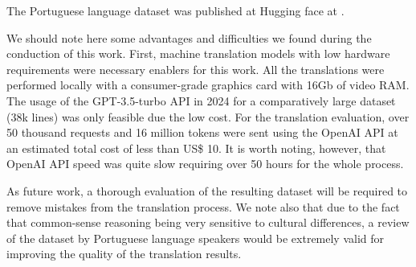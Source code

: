 \documentclass{article}
\begin{document}
The Portuguese language dataset was published at Hugging face at \cite{socialiqa_pt}. 

We should note here some advantages and difficulties we found during the
conduction of this work. First, machine translation models with low hardware
requirements were necessary enablers for this work. All the translations were
performed locally with a consumer-grade graphics card with 16Gb of video RAM.
The usage of the GPT-3.5-turbo API in 2024 for a comparatively large dataset
(38k lines) was only feasible due the low cost. For the translation evaluation,
over 50 thousand requests and 16 million tokens were sent using the OpenAI API
at an estimated total cost of less than US\$ 10. It is worth noting, however,
that OpenAI API speed was quite slow requiring over 50 hours for the whole
process.

As future work, a thorough evaluation of the resulting dataset will be required
to remove mistakes from the translation process. We note also that due to
the fact that common-sense reasoning being very sensitive to cultural
differences, a review of the dataset by Portuguese language speakers would be
extremely valid for improving the quality of the translation results.



\end{document}

